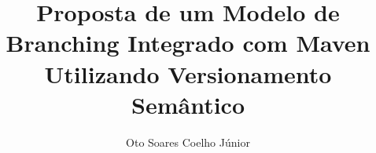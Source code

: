 \documentclass[]{scrartcl}
\title{Proposta de um Modelo de Branching Integrado com Maven Utilizando Versionamento Sem{\^a}ntico}
\author{Oto Soares Coelho J{\'u}nior}
\begin{document}
\maketitle







~\cite{Nobody06}

{}

\end{document}
